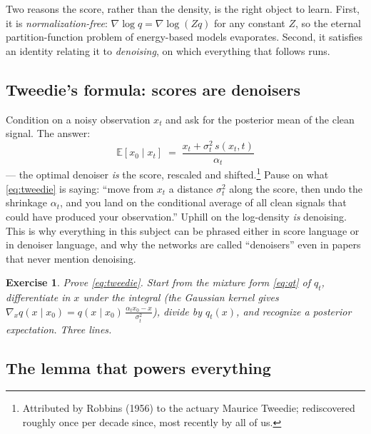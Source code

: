 \documentclass[10pt,a4paper]{article}
\newtheorem{exercise}{Exercise}
\newcommand{\E}{\mathbb{E}}
\newcommand{\score}{s}
\begin{document}
Two reasons the score, rather than the density, is the right object to
learn. First, it is \emph{normalization-free}:
$\nabla\log q = \nabla\log(Zq)$ for any constant $Z$, so the eternal
partition-function problem of energy-based models evaporates. Second, it
satisfies an identity relating it to \emph{denoising}, on which
everything that follows runs.

\subsection{Tweedie's formula: scores are denoisers}

Condition on a noisy observation $x_t$ and ask for the posterior mean of
the clean signal. The answer:
\begin{equation}
\boxed{\;\E[x_0 \mid x_t] \;=\; \frac{x_t + \sigma_t^2\,\score(x_t, t)}{\alpha_t}\;}
\label{eq:tweedie}
\end{equation}
--- the optimal denoiser \emph{is} the score, rescaled and
shifted.\footnote{Attributed by Robbins (1956) to the actuary Maurice
Tweedie; rediscovered roughly once per decade since, most recently by all
of us.} Pause on what \eqref{eq:tweedie} is saying: ``move from $x_t$ a
distance $\sigma_t^2$ along the score, then undo the shrinkage
$\alpha_t$, and you land on the conditional average of all clean signals
that could have produced your observation.'' Uphill on the log-density
\emph{is} denoising. This is why everything in this subject can be phrased
either in score language or in denoiser language, and why the networks are
called ``denoisers'' even in papers that never mention denoising.

\begin{exercise}
Prove \eqref{eq:tweedie}. Start from the mixture form \eqref{eq:qt} of
$q_t$, differentiate in $x$ under the integral (the Gaussian kernel
gives $\nabla_x q(x \mid x_0) = q(x \mid x_0)\,
\tfrac{\alpha_t x_0 - x}{\sigma_t^2}$), divide by $q_t(x)$, and
recognize a posterior expectation. Three lines.
\end{exercise}

\subsection{The lemma that powers everything}
\end{document}
